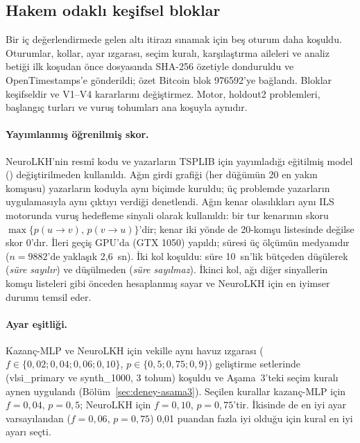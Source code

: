\subsection{Hakem odaklı keşifsel bloklar}\label{sec:deney-hakem}

Bir iç değerlendirmede gelen altı itirazı sınamak için beş oturum daha koşuldu. Oturumlar, kollar,
ayar ızgarası, seçim kuralı, karşılaştırma aileleri ve analiz betiği ilk koşudan önce
 dosyasında SHA-256 özetiyle donduruldu ve OpenTimestamps'e
gönderildi; özet Bitcoin blok 976592'ye bağlandı. Bloklar keşifseldir ve V1--V4 kararlarını değiştirmez. Motor, holdout2 problemleri,
başlangıç turları ve vuruş tohumları ana koşuyla aynıdır.

\paragraph{Yayımlanmış öğrenilmiş skor.}
NeuroLKH'nin \citep{xin_2021_neurolkh} resmî kodu ve yazarların TSPLIB için yayımladığı eğitilmiş
model () değiştirilmeden kullanıldı. Ağın girdi grafiği (her düğümün 20 en yakın
komşusu) yazarların koduyla aynı biçimde kuruldu; üç problemde yazarların uygulamasıyla aynı çıktıyı
verdiği denetlendi. Ağın kenar olasılıkları aynı ILS motorunda vuruş hedefleme sinyali olarak
kullanıldı: bir tur kenarının skoru $\max\{p(u\to v),\,p(v\to u)\}$'dir; kenar iki yönde de
20-komşu listesinde değilse skor 0'dır. İleri geçiş GPU'da (GTX 1050) yapıldı; süresi üç ölçümün
medyanıdır ($n=9882$'de yaklaşık 2,6~sn). İki kol koşuldu: süre 10~sn'lik bütçeden düşülerek
(\emph{süre sayılır}) ve düşülmeden (\emph{süre sayılmaz}). İkinci kol, ağı diğer sinyallerin komşu
listeleri gibi önceden hesaplanmış sayar ve NeuroLKH için en iyimser durumu temsil eder.

\paragraph{Ayar eşitliği.}
Kazanç-MLP ve NeuroLKH için vekille aynı havuz ızgarası ($f\in\{0{,}02;0{,}04;0{,}06;0{,}10\}$,
$p\in\{0{,}5;0{,}75;0{,}9\}$) geliştirme setlerinde (vlsi\_primary ve synth\_1000, 3 tohum) koşuldu
ve Aşama~3'teki seçim kuralı aynen uygulandı (Bölüm~\ref{sec:deney-asama3}). Seçilen kurallar
kazanç-MLP için $f=0{,}04$, $p=0{,}5$; NeuroLKH için $f=0{,}10$, $p=0{,}75$'tir. İkisinde de en iyi
ayar varsayılandan ($f=0{,}06$, $p=0{,}75$) 0,01 puandan fazla iyi olduğu için kural en iyi ayarı seçti.

